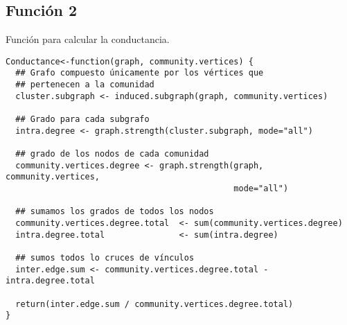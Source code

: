 \documentclass[12pt,letter]{article}
\begin{document}
\newpage
\subsection{Función 2}
Función para calcular la conductancia.

\vspace{0.5cm}
\lstset{language=R, basicstyle=\footnotesize}
\begin{lstlisting}[frame=single]
Conductance<-function(graph, community.vertices) {
  ## Grafo compuesto únicamente por los vértices que 
  ## pertenecen a la comunidad
  cluster.subgraph <- induced.subgraph(graph, community.vertices)
  
  ## Grado para cada subgrafo
  intra.degree <- graph.strength(cluster.subgraph, mode="all")
  
  ## grado de los nodos de cada comunidad
  community.vertices.degree <- graph.strength(graph, community.vertices,
                                              mode="all")
  
  ## sumamos los grados de todos los nodos 
  community.vertices.degree.total  <- sum(community.vertices.degree)
  intra.degree.total               <- sum(intra.degree)
  
  ## sumos todos lo cruces de vínculos
  inter.edge.sum <- community.vertices.degree.total - intra.degree.total
  
  return(inter.edge.sum / community.vertices.degree.total)
}
\end{lstlisting}
\end{document}
